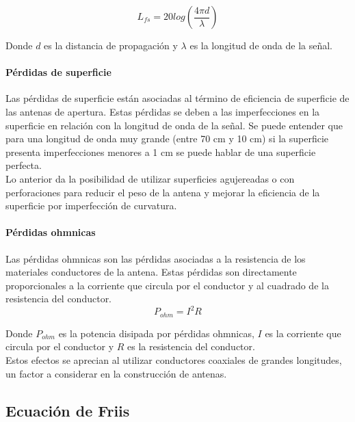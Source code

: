 \begin{equation}
    L_{fs} = 20log\left(\frac{4\pi d}{\lambda}\right)
\end{equation}

Donde $d$ es la distancia de propagación y $\lambda$ es la longitud de onda de la señal.\\

\paragraph{Pérdidas de superficie}

Las pérdidas de superficie están asociadas al término de eficiencia de superficie de las antenas de apertura. Estas pérdidas se deben a las imperfecciones en la superficie en relación con la longitud de onda de la señal. Se puede entender que para una longitud de onda muy grande (entre 70 cm y 10 cm) si la superficie presenta imperfecciones menores a 1 cm se puede hablar de una superficie perfecta.\\

Lo anterior da la posibilidad de utilizar superficies agujereadas o con perforaciones para reducir el peso de la antena y mejorar la eficiencia de la superficie por imperfección de curvatura.\\

\paragraph{Pérdidas ohmnicas}

Las pérdidas ohmnicas son las pérdidas asociadas a la resistencia de los materiales conductores de la antena. Estas pérdidas son directamente proporcionales a la corriente que circula por el conductor y al cuadrado de la resistencia del conductor.\\

\begin{equation}
    P_{ohm} = I^{2}R
\end{equation}

Donde $P_{ohm}$ es la potencia disipada por pérdidas ohmnicas, $I$ es la corriente que circula por el conductor y $R$ es la resistencia del conductor.\\

Estos efectos se aprecian al utilizar conductores coaxiales de grandes longitudes, un factor a considerar en la construcción de antenas.\\

\subsection{Ecuación de Friis}

